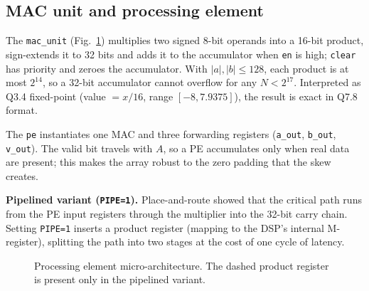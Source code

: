 \documentclass[conference]{IEEEtran}
\begin{document}
\subsection{MAC unit and processing element}
The \texttt{mac\_unit} (Fig.~\ref{fig:pe}) multiplies two signed 8-bit
operands into a 16-bit product, sign-extends it to 32 bits and adds it to the
accumulator when \texttt{en} is high; \texttt{clear} has priority and zeroes
the accumulator. With $|a|,|b|\le128$, each product is at most $2^{14}$, so a
32-bit accumulator cannot overflow for any $N<2^{17}$. Interpreted as Q3.4
fixed-point (value $=x/16$, range $[-8, 7.9375]$), the result is exact in Q7.8
format.

The \texttt{pe} instantiates one MAC and three forwarding registers
(\texttt{a\_out}, \texttt{b\_out}, \texttt{v\_out}). The valid bit travels with
$A$, so a PE accumulates only when real data are present; this makes the
array robust to the zero padding that the skew creates.

\textbf{Pipelined variant (\texttt{PIPE=1}).} Place-and-route showed that the
critical path runs from the PE input registers through the multiplier into
the 32-bit carry chain. Setting \texttt{PIPE=1} inserts a product register
(mapping to the DSP's internal M-register), splitting the path into two
stages at the cost of one cycle of latency.

\begin{figure}[t]
\centering
{}
\caption{Processing element micro-architecture. The dashed product register is present only in the pipelined variant.}
\label{fig:pe}
\end{figure}
\end{document}
